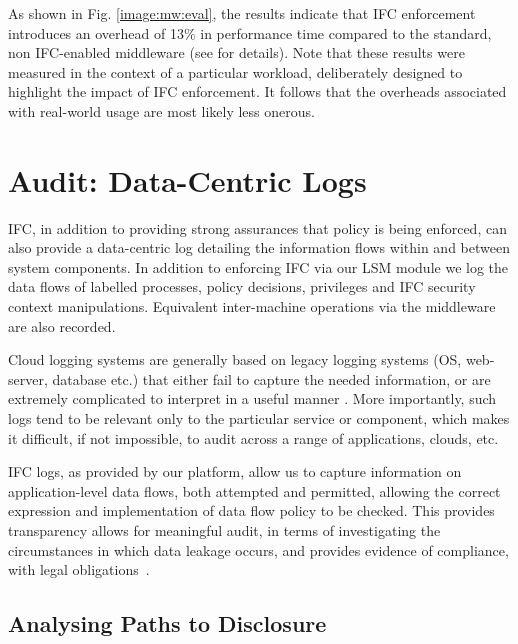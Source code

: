 \documentclass[10pt,journal,compsoc]{IEEEtran}
\begin{document}
As shown in Fig. \ref{image:mw:eval},
the results indicate that IFC enforcement introduces an overhead of  13\% in performance time compared to the standard, non IFC-enabled middleware (see \cite{singh2014ic2e} for details).
Note that these results were measured in the context of a particular workload, deliberately designed to highlight the impact of IFC enforcement. It follows that the overheads associated with real-world usage are most likely less onerous. 





 
\section{Audit: Data-Centric Logs}
\label{sec:audit}




IFC, in addition to providing strong assurances that policy is being enforced, can also provide a data-centric log \cite{Ganjali:2012:ACM:2382536.2382549} detailing the information flows within and between system components. 
In addition to enforcing IFC via our LSM module we log the data flows of labelled processes, policy decisions, privileges and IFC security context manipulations.
Equivalent inter-machine operations via the middleware are also recorded.


Cloud logging systems are generally based on legacy logging systems (OS, web-server, database etc.) that either fail to capture the needed information, or are extremely complicated to interpret in a useful manner \cite{ko2011system}. More importantly, such logs tend to be relevant only to the particular service or component, which makes it difficult, if not impossible, to audit across a range of applications, clouds, etc.

IFC logs, as provided by our platform, allow us to capture information on application-level data flows, both attempted and permitted, allowing the correct expression and implementation of data flow policy to be checked. This provides transparency allows for meaningful audit, in terms of investigating the circumstances in which data leakage occurs, and provides evidence of compliance, \eg with legal obligations~\cite{singh2015:claw-magazine}. 




\subsection{Analysing Paths to Disclosure}
\end{document}
